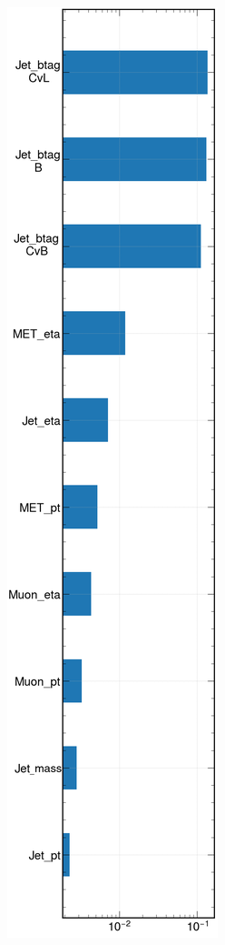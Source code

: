 \begin{minipage}[H]{\linewidth}
\begin{minipage}{0.35\linewidth}
        \includegraphics[height=0.7\textheight]{fig//chap08-kin_reco/ranking1D.png}
        
\end{minipage}
\hfill
\begin{minipage}{0.62\linewidth}
\vspace{-1cm}

\end{minipage}
\end{minipage}
